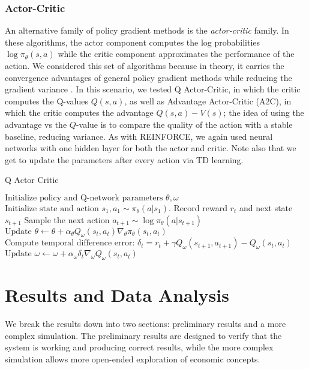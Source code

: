 \documentclass[twoside,twocolumn]{article}
\begin{document}
\subsubsection{Actor-Critic}
An alternative family of policy gradient methods is the \textit{actor-critic} family. In these algorithms, the actor component computes the log probabilities $\log \pi_{\theta}(s, a)$ while the critic component approximates the performance of the action. We considered this set of algorithms because in theory, it carries the convergence advantages of general policy gradient methods while reducing the gradient variance \cite{actor-critic}. In this scenario, we tested Q Actor-Critic, in which the critic computes the Q-values $Q(s,a)$, as well as Advantage Actor-Critic (A2C), in which the critic computes the advantage $Q(s, a) - V(s)$; the idea of using the advantage vs the $Q$-value is to compare the quality of the action with a stable baseline, reducing variance.  As with REINFORCE, we again used neural networks with one hidden layer for both the actor and critic. Note also that we get to update the parameters after every action via TD learning.
\begin{algorithm}
\caption{Q Actor Critic}\label{euclid}
\begin{algorithmic}[1]
\State $\text{Initialize policy and Q-network parameters }\theta, \omega$
\State $\text{Initialize state and action }s_1, a_1 \sim \pi_{\theta}(a|s_1)$.
\State Record reward $r_t$ and next state $s_{t+1}$
\State Sample the next action $a_{t+1} \sim \log \pi_{\theta}(a|s_{t+1})$
\State $\text{Update } \theta \leftarrow \theta + \alpha_{\theta} Q_{\omega}(s_t,a_t) \nabla_{\theta} \pi_{\theta} (s_t, a_t)$
\State $\text{Compute temporal difference error: }\delta_t = r_t + \gamma Q_{\omega}(s_{t+1}, a_{t+1}) - Q_{\omega}(s_{t}, a_{t})$
\State $\text{Update } \omega \leftarrow \omega + \alpha_{\omega} \delta_t \nabla_{\omega} Q_{\omega} (s_t, a_t)$
\EndFor
\EndFor
\State \Return {$\theta, \omega$}
\EndProcedure
\end{algorithmic}
\end{algorithm}



\section{Results and Data Analysis}

We break the results down into two sections: preliminary results and a more complex simulation. The preliminary results are designed to verify that the system is working and producing correct results, while the more complex simulation allows more open-ended exploration of economic concepts.
\end{document}
